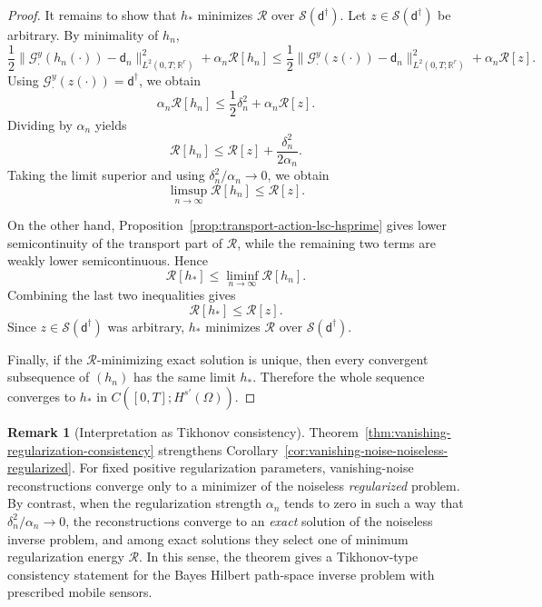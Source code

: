 \documentclass{article}
\theoremstyle{definition}
\newtheorem{remark}[theorem]{Remark}
\newcommand{\obsdata}{\mathsf{d}}
\begin{document}
\begin{proof}
    It remains to show that \(h_\ast\) minimizes \(\mathcal R\) over
    \(\mathcal S(\obsdata^\dagger)\). Let \(z\in \mathcal S(\obsdata^\dagger)\) be arbitrary. By
    minimality of \(h_n\),
    \[
        \frac12 \|\mathcal G_\cdot^y(h_n(\cdot))-\obsdata_n\|_{L^2(0,T;\mathbb R^r)}^2
        +
        \alpha_n \mathcal R[h_n]
        \le
        \frac12 \|\mathcal G_\cdot^y(z(\cdot))-\obsdata_n\|_{L^2(0,T;\mathbb R^r)}^2
        +
        \alpha_n \mathcal R[z].
    \]
    Using \(\mathcal G_\cdot^y(z(\cdot))=\obsdata^\dagger\), we obtain
    \[
        \alpha_n \mathcal R[h_n]
        \le
        \frac12 \delta_n^2 + \alpha_n \mathcal R[z].
    \]
    Dividing by \(\alpha_n\) yields
    \[
        \mathcal R[h_n]
        \le
        \mathcal R[z] + \frac{\delta_n^2}{2\alpha_n}.
    \]
    Taking the limit superior and using \(\delta_n^2/\alpha_n\to 0\), we obtain
    \[
        \limsup_{n\to\infty}\mathcal R[h_n]\le \mathcal R[z].
    \]

    On the other hand, Proposition~\ref{prop:transport-action-lsc-hsprime} gives lower semicontinuity of
    the transport part of \(\mathcal R\), while the remaining two terms are weakly lower semicontinuous.
    Hence
    \[
        \mathcal R[h_\ast]
        \le
        \liminf_{n\to\infty}\mathcal R[h_n].
    \]
    Combining the last two inequalities gives
    \[
        \mathcal R[h_\ast]\le \mathcal R[z].
    \]
    Since \(z\in \mathcal S(\obsdata^\dagger)\) was arbitrary, \(h_\ast\) minimizes
    \(\mathcal R\) over \(\mathcal S(\obsdata^\dagger)\).

    Finally, if the \(\mathcal R\)-minimizing exact solution is unique, then every convergent subsequence
    of \((h_n)\) has the same limit \(h_\ast\). Therefore the whole sequence converges to \(h_\ast\) in
    \(C([0,T];H^{s'}(\Omega))\).
\end{proof}

\begin{remark}[Interpretation as Tikhonov consistency]
    \label{rem:tikhonov-consistency}
    Theorem~\ref{thm:vanishing-regularization-consistency} strengthens
    Corollary~\ref{cor:vanishing-noise-noiseless-regularized}. For fixed positive regularization
    parameters, vanishing-noise reconstructions converge only to a minimizer of the noiseless
    \emph{regularized} problem. By contrast, when the regularization strength \(\alpha_n\) tends to zero
    in such a way that \(\delta_n^2/\alpha_n\to 0\), the reconstructions converge to an \emph{exact}
    solution of the noiseless inverse problem, and among exact solutions they select one of minimum
    regularization energy \(\mathcal R\). In this sense, the theorem gives a Tikhonov-type consistency
    statement for the Bayes Hilbert path-space inverse problem with prescribed mobile sensors.
\end{remark}
\end{document}
